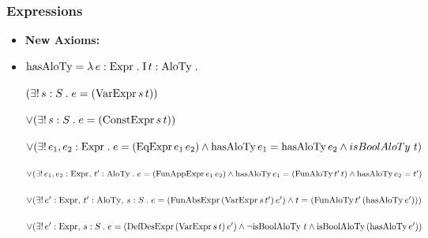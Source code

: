 \documentclass[xcolor={dvipsnames}]{beamer}
\begin{document}
\begin{frame}
\frametitle{Expressions}
\footnotesize
\vspace{-2mm}
\begin{thyext}[Expressions]
\noindent
\begin{itemize} \setlength{\itemsep}{0pt}\vspace{-6mm}
\item[]\hspace{-3ex}\textbf{New Axioms:}
\be
\item<only@1> \scriptsize{
        $\text{hasAloTy} = \lambda\, e : \text{Expr} \mathrel{.}\mathrm{I}\, t : \text{AloTy} \mathrel{.}$
        
        $(\exists!\, s : S \mathrel{.} e = (\text{VarExpr}\,s\,t))$
        
        $\lor (\exists!\, s : S \mathrel{.} e = (\text{ConstExpr}\,s\,t))$
        
        $\lor (\exists!\, e_1,e_2 : \text{Expr} \mathrel{.} e = (\text{EqExpr}\,e_1\,e_2) \land \text{hasAloTy}\,e_1 = \text{hasAloTy}\,e_2 \land isBoolAloTy\ t)$
        
        $\lor (\exists!\, e_1, e_2 : \text{Expr}, \, t' : \text{AloTy} \mathrel{.} e = (\text{FunAppExpr}\,e_1\,e_2) \land \text{hasAloTy}\,e_1 =\\(\text{FunAloTy}\,t'\,t) \land \text{hasAloTy}\,e_2 = t')$
        
        $\lor (\exists!\, e' : \text{Expr}, \, t' : \text{AloTy}, \, s : S \mathrel{.} e = (\text{FunAbsExpr}\,(\text{VarExpr}\,s\,t')\,e') \land t = (\text{FunAloTy}\,t'\,(\text{hasAloTy}\,e')))$
        
        $\lor (\exists!\, e' : \text{Expr}, \, s : S \mathrel{.} e = (\text{DefDesExpr}\,(\text{VarExpr}\,s\,t)\,e') \land \neg \text{isBoolAloTy}\ t \land \text{isBoolAloTy}\, {(\text{hasAloTy}\,e')})$
        
}
\end{itemize}
\end{thyext}
\end{frame}
\end{document}
